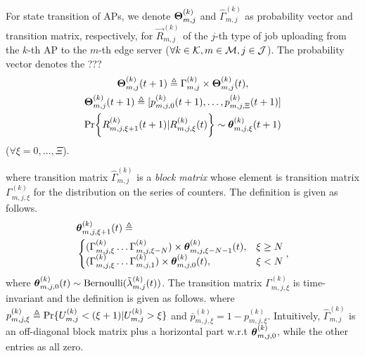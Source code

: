 For state transition of APs, we denote $\boldsymbol{\Theta}^{(k)}_{m,j}$ and $\hat{\Gamma}^{(k)}_{m,j}$ as probability vector and transition matrix, respectively, for $\vec{R}^{(k)}_{m,j}$ of the $j$-th type of job uploading from the $k$-th AP to the $m$-th edge server ($\forall k\in\mathcal{K}, m\in\mathcal{M}, j\in\mathcal{J}$).
The probability vector denotes the ???
\begin{gather*}
    \vecG{\Theta}^{(k)}_{m,j}({t+1}) \define \Gamma^{(k)}_{m,j} \times \vecG{\Theta}^{(k)}_{m,j}({t}),
    \\
    \vecG{\Theta}^{(k)}_{m,j}({t+1}) \define [p^{(k)}_{m,j,0}({t+1}), \dots, p^{(k)}_{m,j,\Xi}({t+1})]
    \\
    \Pr\Brace{R^{(k)}_{m,j,\xi+1}({t+1})|R^{(k)}_{m,j,\xi}({t})} \sim \vecG{\theta}^{(k)}_{m,j,\xi}({t+1})
\end{gather*}
($\forall \xi=0,\dots,\Xi$).

where transition matrix $\hat{\Gamma}^{(k)}_{m,j}$ is a \emph{block matrix} whose element is transition matrix $\Gamma^{(k)}_{m,j,\xi}$ for the distribution on the series of counters. The definition is given as follows.
\begin{align}
    &\boldsymbol{\theta}^{(k)}_{m,j,\xi+1}(t) \triangleq
    \nonumber\\
    &\begin{cases}
        ( \Gamma^{(k)}_{m,j,\xi} \dots \Gamma^{(k)}_{m,j,\xi-N} ) \times \boldsymbol{\theta}^{(k)}_{m,j,\xi-N-1}({t}), &{\xi \geq N}
        \\
        ( \Gamma^{(k)}_{m,j,\xi} \dots \Gamma^{(k)}_{m,j,1} ) \times \boldsymbol{\theta}^{(k)}_{m,j,0}({t}), &{\xi < N}
    \end{cases},
\end{align}
where $\boldsymbol{\theta}^{(k)}_{m,j,0}({t}) \sim \text{Bernoulli}(\tilde{\lambda}^{(k)}_{m,j}({t}))$. The transition matrix $\Gamma^{(k)}_{m,j,\xi}$ is time-invariant and the definition is given as follows.
where $p^{(k)}_{m,j,\xi} \triangleq \Pr\{U^{(k)}_{m,j} < (\xi+1) | U^{(k)}_{m,j}>\xi\}$ and $\bar{p}^{(k)}_{m,j,\xi} = 1 - p^{(k)}_{m,j,\xi}$.
Intuitively, $\hat{\Gamma}^{(k)}_{m,j}$ is an off-diagonal block matrix plus a horizontal part w.r.t $\boldsymbol{\theta}^{(k)}_{m,j,0}$, while the other entries as all zero.

